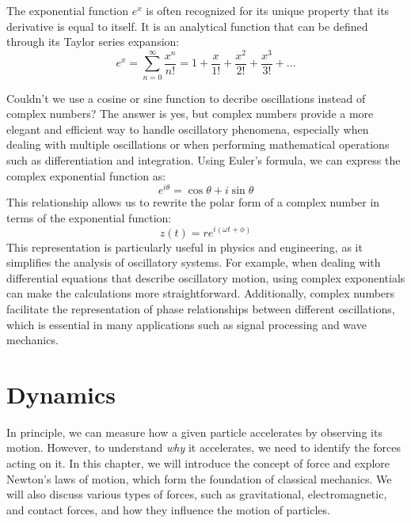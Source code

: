 \documentclass[12pt,oneside]{book}
\numberwithin{equation}{chapter}
\begin{document}
The exponential function $e^x$ is often recognized for its unique property that its derivative is equal to itself. It is an analytical function that can be defined through its Taylor series expansion:
\begin{equation}
    e^x = \sum_{n=0}^{\infty} \frac{x^n}{n!} = 1 + \frac{x}{1!} + \frac{x^2}{2!} + \frac{x^3}{3!} + \ldots
\end{equation}

Couldn't we use a cosine or sine function to decribe oscillations instead of complex numbers? The answer is yes, but complex numbers provide a more elegant and efficient way to handle oscillatory phenomena, especially when dealing with multiple oscillations or when performing mathematical operations such as differentiation and integration. Using Euler's formula, we can express the complex exponential function as:
\begin{equation}
    e^{i\theta} = \cos \theta + i \sin \theta
\end{equation}
This relationship allows us to rewrite the polar form of a complex number in terms of the exponential function:
\begin{equation}
    z(t) = r e^{i(\omega t + \phi)}
\end{equation}
This representation is particularly useful in physics and engineering, as it simplifies the analysis of oscillatory systems. For example, when dealing with differential equations that describe oscillatory motion, using complex exponentials can make the calculations more straightforward. Additionally, complex numbers facilitate the representation of phase relationships between different oscillations, which is essential in many applications such as signal processing and wave mechanics.

\chapter{Dynamics}
In principle, we can measure how a given particle accelerates by observing its motion. However, to understand \emph{why} it accelerates, we need to identify the forces acting on it. In this chapter, we will introduce the concept of force and explore Newton's laws of motion, which form the foundation of classical mechanics. We will also discuss various types of forces, such as gravitational, electromagnetic, and contact forces, and how they influence the motion of particles.
\end{document}
